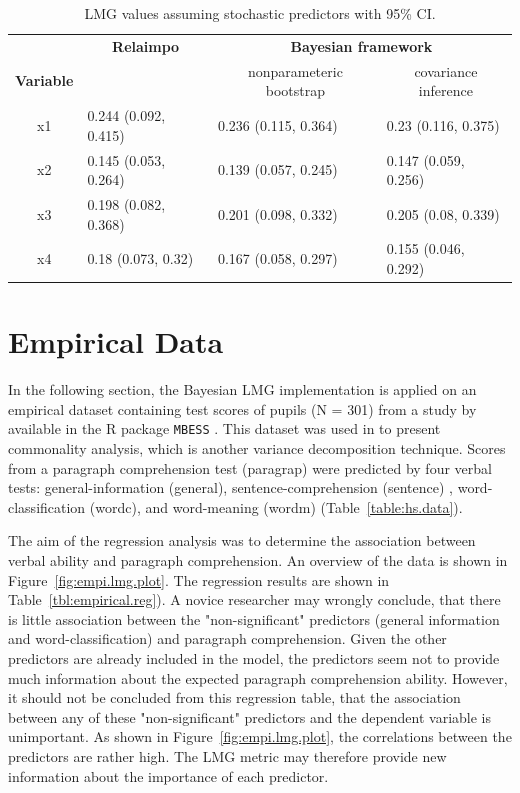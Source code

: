 \documentclass[11pt,a4paper,twoside]{book}\usepackage[]{graphicx}\usepackage[]{color}
\begin{document}
\begin{table}[h]
\caption{LMG values assuming stochastic predictors with 95\% CI.}
\centering
\begin{tabular}{clll}
   \toprule
  & \multicolumn{1}{c}{\textbf{Relaimpo}} & \multicolumn{2}{c}{\textbf{Bayesian framework}} \\ \cmidrule(r){2-2}\cmidrule(l){3-4}
 \textbf{Variable} &  & \multicolumn{1}{c}{nonparameteric bootstrap}& \multicolumn{1}{c}{covariance inference} \\
 \midrule
x1 & 0.244 (0.092, 0.415)  & 0.236 (0.115, 0.364) &  0.23 (0.116, 0.375) \\ 
x2 & 0.145 (0.053, 0.264)  & 0.139 (0.057, 0.245)  & 0.147 (0.059, 0.256) \\ 
x3 & 0.198 (0.082, 0.368)  & 0.201 (0.098, 0.332)  & 0.205 (0.08, 0.339) \\ 
x4 & 0.18 (0.073, 0.32) & 0.167 (0.058, 0.297) & 0.155 (0.046, 0.292) \\ 
   \bottomrule
\end{tabular}
\label{tbl:nonstochEx1relaimpstoch}
\end{table}







\clearpage

\section{Empirical Data}
In the following section, the Bayesian LMG implementation is applied on an empirical dataset containing test scores of pupils (N = 301) from a study by \cite{Holzinger1939} available in the R package \texttt{MBESS} \citep{MBESS}. This dataset was used in \cite{Nimon2008} to present commonality analysis, which is another variance decomposition technique. Scores from a paragraph comprehension test (paragrap) were predicted by four verbal tests:  general-information (general),  sentence-comprehension (sentence) ,  word-classification (wordc), and  word-meaning (wordm) (Table~\ref{table:hs.data}). 

The aim of the regression analysis was to determine the  association between verbal ability and paragraph comprehension.  
An overview of the data is shown in Figure~\ref{fig:empi.lmg.plot}. The regression results are shown in Table~\ref{tbl:empirical.reg}). A novice researcher may wrongly conclude, that there is little association between the "non-significant" predictors (general information and word-classification) and paragraph comprehension. Given the other predictors are already included in the model, the predictors seem not to provide  much information about the expected paragraph comprehension ability. However, it should not be concluded from this regression table, that the association between any of these "non-significant" predictors and the dependent variable is unimportant. As shown in Figure~\ref{fig:empi.lmg.plot}, the correlations between the predictors are rather high. The LMG metric may therefore provide new information about the importance of each predictor. 
\end{document}
